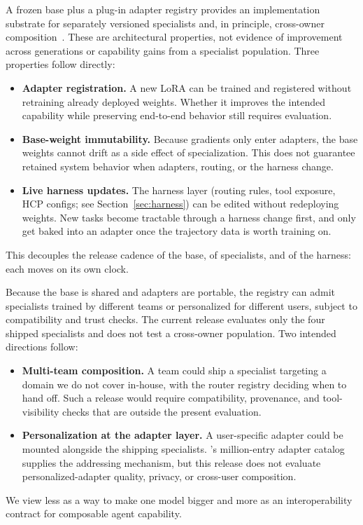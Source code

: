 A frozen base plus a plug-in adapter registry provides an implementation substrate for separately versioned specialists and, in principle, cross-owner composition~\citep{macaron_v1_blog2026,lu2026announcing}. These are architectural properties, not evidence of improvement across generations or capability gains from a specialist population. Three properties follow directly:
\begin{itemize}[leftmargin=*]
  \item \textbf{Adapter registration.} A new LoRA can be trained and registered without retraining already deployed weights. Whether it improves the intended capability while preserving end-to-end behavior still requires evaluation.
  \item \textbf{Base-weight immutability.} Because gradients only enter adapters, the base weights cannot drift as a side effect of specialization. This does not guarantee retained system behavior when adapters, routing, or the harness change.
  \item \textbf{Live harness updates.} The harness layer (routing rules, tool exposure, HCP configs; see Section~\ref{sec:harness}) can be edited without redeploying weights. New tasks become tractable through a harness change first, and only get baked into an adapter once the trajectory data is worth training on.
\end{itemize}
This decouples the release cadence of the base, of specialists, and of the harness: each moves on its own clock.

Because the base is shared and adapters are portable, the registry can admit specialists trained by different teams or personalized for different users, subject to compatibility and trust checks. The current release evaluates only the four shipped specialists and does not test a cross-owner population. Two intended directions follow:
\begin{itemize}[leftmargin=*]
  \item \textbf{Multi-team composition.} A team could ship a specialist targeting a domain we do not cover in-house, with the router registry deciding when to hand off. Such a release would require compatibility, provenance, and tool-visibility checks that are outside the present evaluation.
  \item \textbf{Personalization at the adapter layer.} A user-specific adapter could be mounted alongside the shipping specialists. \mint's million-entry adapter catalog~\citep{lu2026announcing} supplies the addressing mechanism, but this release does not evaluate personalized-adapter quality, privacy, or cross-user composition.
\end{itemize}
We view \molshort{} less as a way to make one model bigger and more as an interoperability contract for composable agent capability.

